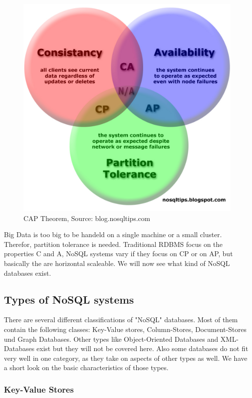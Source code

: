 \documentclass{acm_proc_article-sp}
\begin{document}
\begin{figure}[hbtp]
	\centering
	\includegraphics[scale=0.2]{CAP_Diagram_dist-copy.jpg}
	\caption{CAP Theorem, Source: blog.nosqltips.com}
\end{figure}

Big Data is too big to be handeld on a single machine or a small cluster. Therefor, partition tolerance is needed. Traditional RDBMS focus on the properties C and A, NoSQL systems vary if they focus on CP or on AP, but basically the are horizontal scaleable. We will now see what kind of NoSQL databases exist.

\subsection{Types of NoSQL systems}

There are several different classifications of "NoSQL" databases. Most of them contain the following classes: Key-Value stores, Column-Stores, Document-Stores und Graph Databases. Other types like Object-Oriented Databases and XML-Databases exist but they will not be covered here. Also some databases do not fit very well in one category, as they take on aspects of other types as well. We have a short look on the basic characteristics of those types.

\subsubsection{Key-Value Stores}
\end{document}
